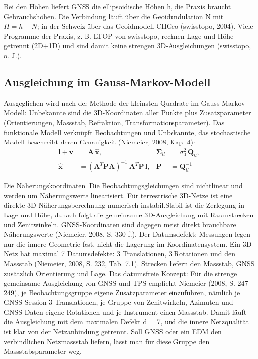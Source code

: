Bei den Höhen liefert GNSS die ellipsoidische Höhen h, die Praxis braucht Gebrauchshöhen. 
Die Verbindung läuft über die Geoidundulation N mit $H = h - N$; in der Schweiz über das Geoidmodell CHGeo (swisstopo, 2004).
Viele Programme der Praxis, z. B. LTOP von swisstopo, rechnen Lage und Höhe getrennt (2D+1D) und sind damit keine strengen 3D-Ausgleichungen (swisstopo, o. J.).

\subsection{Ausgleichung im Gauss-Markov-Modell}
\label{sec:Ausgleichung im Gauss-Markov-Modell}

Ausgeglichen wird nach der Methode der kleinsten Quadrate im Gauss-Markov-Modell: Unbekannte sind die 3D-Koordinaten aller Punkte plus Zusatzparameter (Orientierungen, Massstab, Refraktion, Transformationsparameter). 
Das funktionale Modell verknüpft Beobachtungen und Unbekannte, das stochastische Modell beschreibt deren Genauigkeit (Niemeier, 2008, Kap. 4):
\[
\begin{aligned}
\mathbf{l} + \mathbf{v} &= \mathbf{A}\,\hat{\mathbf{x}}, &
\boldsymbol{\Sigma}_{ll} &= \sigma_0^2\,\mathbf{Q}_{ll}, \\
\hat{\mathbf{x}} &= \left(\mathbf{A}^{T}\mathbf{P}\mathbf{A}\right)^{-1}
\                    \mathbf{A}^{T}\mathbf{P}\,\mathbf{l}, &
\mathbf{P} &= \mathbf{Q}_{ll}^{-1}
\end{aligned}
\]

Die Näherungskoordinaten: Die Beobachtungsgleichungen sind nichtlinear und werden um Näherungswerte linearisiert. 
Für terrestrische 3D-Netze ist eine direkte 3D-Näherungsberechnung numerisch instabil.Stabil ist die Zerlegung in Lage und Höhe, danach folgt die gemeinsame 3D-Ausgleichung mit Raumstrecken und Zenitwinkeln. 
GNSS-Koordinaten sind dagegen meist direkt brauchbare Näherungswerte (Niemeier, 2008, S. 330 f.).
Der Datumsdefekt: Messungen legen nur die innere Geometrie fest, nicht die Lagerung im Koordinatensystem. 
Ein 3D-Netz hat maximal 7 Datumsdefekte: 3 Translationen, 3 Rotationen und den Massstab (Niemeier, 2008, S. 232, Tab. 7.1). 
Strecken liefern den Massstab, GNSS zusätzlich Orientierung und Lage.
Das datumsfreie Konzept: Für die strenge gemeinsame Ausgleichung von GNSS und TPS empfiehlt Niemeier (2008, S. 247–249), je Beobachtungsgruppe eigene Zusatzparameter einzuführen, nämlich je GNSS-Session 3 Translationen, je Gruppe von Zenitwinkeln, Azimuten und GNSS-Daten eigene Rotationen und je Instrument einen Massstab. 
Damit läuft die Ausgleichung mit dem maximalen Defekt d = 7, und die innere Netzqualität ist klar von der Netzanbindung getrennt. 
Soll GNSS oder ein EDM den verbindlichen Netzmassstab liefern, lässt man für diese Gruppe den Massstabsparameter weg. \bigskip 

